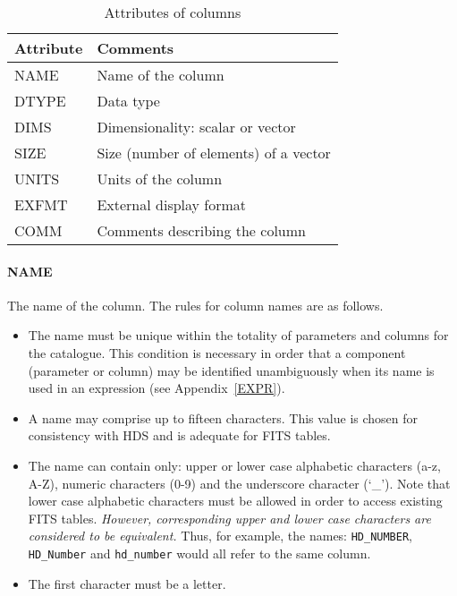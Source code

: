 \documentclass[twoside,11pt]{starlink}
\begin{document}
\begin{table}[htbp]

\begin{center}
\begin{tabular}{ll}
Attribute  & Comments                              \\ \hline
NAME       & Name of the column                    \\
DTYPE      & Data type                             \\
DIMS       & Dimensionality: scalar or vector      \\
SIZE       & Size (number of elements) of a vector \\
UNITS      & Units of the column                   \\
EXFMT      & External display format               \\
COMM       & Comments describing the column        \\
\end{tabular}
\end{center}

\caption{Attributes of columns\label{COLUMN_ATT} }

\end{table}

\paragraph{NAME}
The name of the column. The rules for column names are as follows.

\begin{itemize}

  \item The name must be unique within the totality of parameters and
   columns for the catalogue. This condition is necessary in order that
   a component (parameter or column) may be identified unambiguously
   when its name is used in an expression (see Appendix~\ref{EXPR}).

  \item A name may comprise up to fifteen characters. This value is chosen
   for consistency with HDS and is adequate for FITS tables.

  \item The name can contain only: upper or lower case alphabetic
   characters (a-z, A-Z), numeric characters (0-9) and the underscore
   character (`\_'). Note that lower case alphabetic characters must
   be allowed in order to access existing FITS tables. \textit{However,
   corresponding upper and lower case characters are considered to be
   equivalent.} Thus, for example, the names: \texttt{HD\_NUMBER}, \texttt{HD\_Number} and \texttt{hd\_number} would all refer to the same column.

  \item The first character must be a letter.

\end{itemize}
\end{document}
